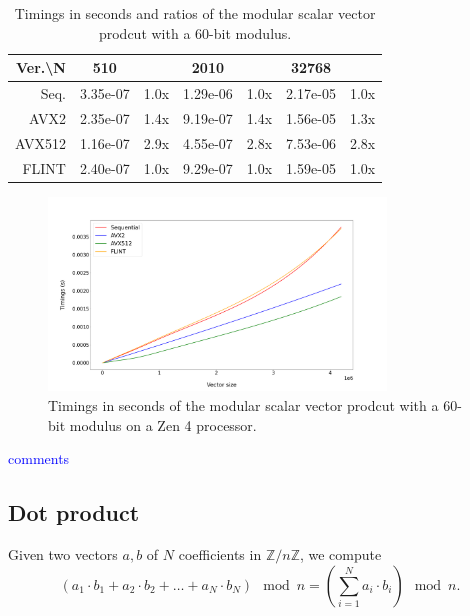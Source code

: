 \documentclass[a4paper]{article}
\begin{document}
\begin{table}[h!]
\begin{tabular}{|r|*{3}{c c|}}
        \hline
        \rowcolor{myGray}
        Ver.\textbackslash N & 510 & & 2010 & & 32768 & \\
        \hline
        \cellcolor{myGray} Seq. & 3.35e-07 & 1.0x & 1.29e-06 & 1.0x & 2.17e-05 & 1.0x \\
        \hline
        \cellcolor{myGray} AVX2 & 2.35e-07 & 1.4x & 9.19e-07 & 1.4x & 1.56e-05 & 1.3x \\
        \hline
        \cellcolor{myGray} AVX512 & 1.16e-07 & 2.9x & 4.55e-07 & 2.8x & 7.53e-06 & 2.8x \\
        \hline
        \cellcolor{myGray} FLINT & 2.40e-07 & 1.0x & 9.29e-07 & 1.0x & 1.59e-05 & 1.0x \\
        \hline
    \end{tabular}
    \caption{Timings in seconds and ratios of the modular scalar vector prodcut with a 60-bit modulus.}
\end{table}

\begin{figure}[h!]
    \begin{center}
        \includegraphics[width=0.8\textwidth]{scalar-vector-mod_argiope.png}
    \end{center}
    \caption{Timings in seconds of the modular scalar vector prodcut with a 60-bit modulus on a Zen 4 processor.}
\end{figure}

\textcolor{blue}{comments}

\newpage
\subsection{Dot product}

Given two vectors $a,b$ of $N$ coefficients in $\mathbb{Z}/n\mathbb{Z}$, we compute
\[
\left(a_1\cdot b_1 + a_2\cdot b_2 + \dots + a_N\cdot b_N\right) \mod n = \left(\sum_{i=1}^N a_i\cdot b_i\right) \mod n.
\]
\end{document}
